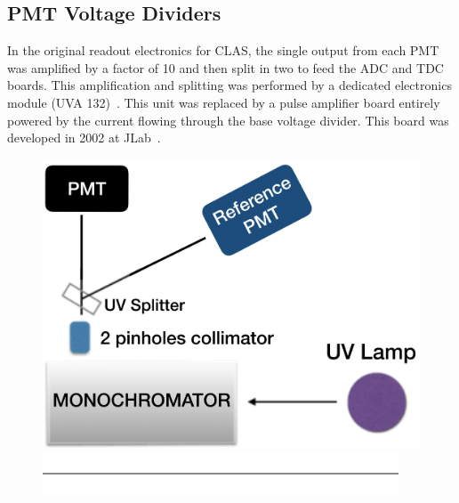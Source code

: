 \subsection{PMT Voltage Dividers}
\label{sec:dividers}

In the original readout electronics for CLAS, the single output from each PMT was amplified by a factor of 10 and then
split in two to feed the ADC and TDC boards. This amplification and splitting was performed by a dedicated electronics
module (UVA 132)~\cite{Adams:2001kk}. This unit was replaced by a pulse amplifier board entirely powered by the
current flowing through the base voltage divider. This board was developed in 2002 at JLab~\cite{Popov:2003mj}.

\begin{figure}[H]
	\centering
	\includegraphics[width=0.95\columnwidth, height=0.75\columnwidth]{img/pmtTestingSetup.png}
	\includegraphics[width=0.99\columnwidth, keepaspectratio]{img/blank.png}

\end{figure}
